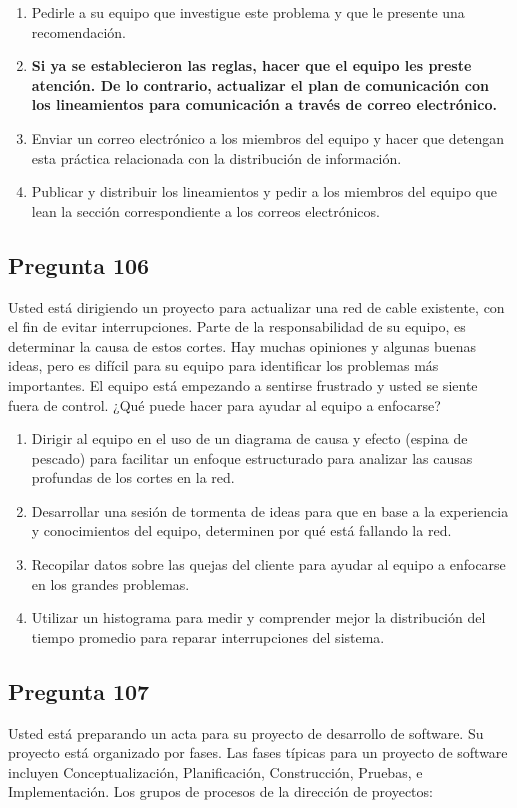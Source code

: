 \documentclass[11pt,a4paper]{article}
\begin{document}
\begin{enumerate}[label=\alph*)]
  \item Pedirle a su equipo que investigue este problema y que le presente una recomendación.
  \item \textbf{Si ya se establecieron las reglas, hacer que el equipo les preste atención. De lo contrario, actualizar el plan de comunicación con los lineamientos para comunicación a través de correo electrónico.}
  \item Enviar un correo electrónico a los miembros del equipo y hacer que detengan esta práctica relacionada con la distribución de información.
  \item Publicar y distribuir los lineamientos y pedir a los miembros del equipo que lean la sección correspondiente a los correos electrónicos.
\end{enumerate}

\subsection*{Pregunta 106}
Usted está dirigiendo un proyecto para actualizar una red de cable existente, con el fin de evitar interrupciones. Parte de la responsabilidad de su equipo, es determinar la causa de estos cortes. Hay muchas opiniones y algunas buenas ideas, pero es difícil para su equipo para identificar los problemas más importantes. El equipo está empezando a sentirse frustrado y usted se siente fuera de control. ¿Qué puede hacer para ayudar al equipo a enfocarse?

\begin{enumerate}[label=\alph*)]
  \item Dirigir al equipo en el uso de un diagrama de causa y efecto (espina de pescado) para facilitar un enfoque estructurado para analizar las causas profundas de los cortes en la red.
  \item Desarrollar una sesión de tormenta de ideas para que en base a la experiencia y conocimientos del equipo, determinen por qué está fallando la red.
  \item Recopilar datos sobre las quejas del cliente para ayudar al equipo a enfocarse en los grandes problemas.
  \item Utilizar un histograma para medir y comprender mejor la distribución del tiempo promedio para reparar interrupciones del sistema.
\end{enumerate}

\subsection*{Pregunta 107}
Usted está preparando un acta para su proyecto de desarrollo de software. Su proyecto está organizado por fases. Las fases típicas para un proyecto de software incluyen Conceptualización, Planificación, Construcción, Pruebas, e Implementación. Los grupos de procesos de la dirección de proyectos:
\end{document}
